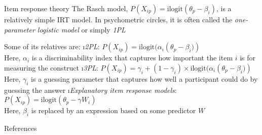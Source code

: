 \documentclass[aspectratio=169]{beamer}
\begin{document}
\begin{frame}[fragile]{Item response theory}
The Rasch model, $P(X_{ip}) = \text{ilogit}(\theta_p - \beta_i)$, is a relatively simple IRT model.  In psychometric circles, it is often called the \textit{one-parameter logistic model} or simply \emph{1PL}\pause

Some of its relatives are:
\bi
\i \emph{2PL}: $P(X_{ip}) = \text{ilogit}(\alpha_i\left(\theta_p - \beta_i)\right)$\\
Here, $\alpha_i$ is a discriminability index that captures how important the item $i$ is for measuring the construct
\i \emph{3PL}: $P(X_{ip}) = \gamma_i + (1-\gamma_i) \times \text{ilogit}(\alpha_i\left(\theta_p - \beta_i)\right)$\\
Here, $\gamma_i$ is a guessing parameter that captures how well a participant could do by guessing the answer
\i \emph{Explanatory item response models}: $P(X_{ip}) = \text{ilogit}\left(\theta_p - \gamma W_i\right)$\\
Here, $\beta_i$ is replaced by an expression based on some predictor $W$
\ei

\end{frame}


\begin{frame}[allowframebreaks]{References}


\end{frame}



\maketitle
\end{document}
